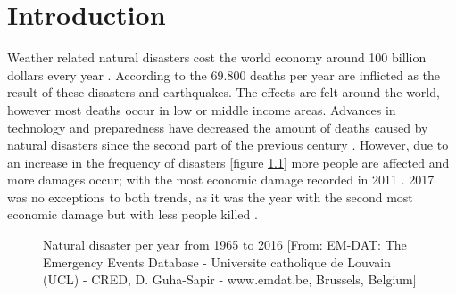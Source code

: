 \chapter{Introduction} \label{intro}

\noindent Weather related natural disasters cost the world economy around 100 billion dollars every year \citep{Kousky2014}. According to the \citet{CRED2015} 69.800 deaths per year are inflicted as the result of these disasters and earthquakes. The effects are felt around the world, however most deaths occur in low or middle income areas. Advances in technology and preparedness have decreased the amount of deaths caused by natural disasters since the second part of the previous century \citep{UN2004}. However, due to an increase in the frequency of disasters [figure \ref{fig:graph1}] more people are affected and more damages occur; with the most economic damage recorded in 2011 \citep{Coppola2015, Kerle2015}. 2017 was no exceptions to both trends, as it was the year with the second most economic damage but with less people killed \citep{RE2018}.  \\
\begin{figure}[h]
	\caption{\footnotesize{Natural disaster per year from 1965 to 2016 [From:  EM-DAT: The Emergency Events Database - Universite catholique de Louvain (UCL) - CRED, D. Guha-Sapir - www.emdat.be, Brussels, Belgium]}}
	\label{fig:graph1}
\end{figure}

